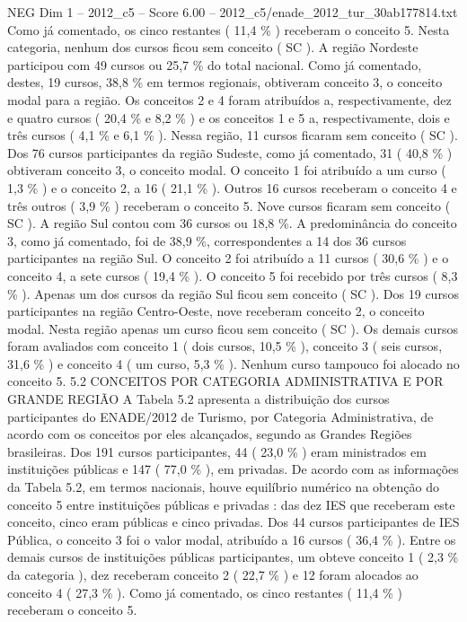 \begin{textsample}{NEG Dim 1 – 2012\_c5 – Score 6.00 – 2012\_c5/enade\_2012\_tur\_30ab177814.txt}
Como já comentado, os cinco restantes ( 11,4 \% ) receberam o conceito 5.
Nesta categoria, nenhum dos cursos ficou sem conceito ( SC ).
A região Nordeste participou com 49 cursos ou 25,7 \% do total nacional.
Como já comentado, destes, 19 cursos, 38,8 \% em termos regionais, obtiveram conceito 3, o conceito modal para a região.
Os conceitos 2 e 4 foram atribuídos a, respectivamente, dez e quatro cursos ( 20,4 \% e 8,2 \% ) e os conceitos 1 e 5 a, respectivamente, dois e três cursos ( 4,1 \% e 6,1 \% ).
Nessa região, 11 cursos ficaram sem conceito ( SC ).
Dos 76 cursos participantes da região Sudeste, como já comentado, 31 ( 40,8 \% ) obtiveram conceito 3, o conceito modal.
O conceito 1 foi atribuído a um curso ( 1,3 \% ) e o conceito 2, a 16 ( 21,1 \% ).
Outros 16 cursos receberam o conceito 4 e três outros ( 3,9 \% ) receberam o conceito 5.
Nove cursos ficaram sem conceito ( SC ).
A região Sul contou com 36 cursos ou 18,8 \%.
A predominância do conceito 3, como já comentado, foi de 38,9 \%, correspondentes a 14 dos 36 cursos participantes na região Sul.
O conceito 2 foi atribuído a 11 cursos ( 30,6 \% ) e o conceito 4, a sete cursos ( 19,4 \% ).
O conceito 5 foi recebido por três cursos ( 8,3 \% ).
Apenas um dos cursos da região Sul ficou sem conceito ( SC ).
Dos 19 cursos participantes na região Centro-Oeste, nove receberam conceito 2, o conceito modal.
Nesta região apenas um curso ficou sem conceito ( SC ).
Os demais cursos foram avaliados com conceito 1 ( dois cursos, 10,5 \% ), conceito 3 ( seis cursos, 31,6 \% ) e conceito 4 ( um curso, 5,3 \% ).
Nenhum curso tampouco foi alocado no conceito 5. 5.2 CONCEITOS POR CATEGORIA ADMINISTRATIVA E POR GRANDE REGIÃO A Tabela 5.2 apresenta a distribuição dos cursos participantes do ENADE/2012 de Turismo, por Categoria Administrativa, de acordo com os conceitos por eles alcançados, segundo as Grandes Regiões brasileiras.
Dos 191 cursos participantes, 44 ( 23,0 \% ) eram ministrados em instituições públicas e 147 ( 77,0 \% ), em privadas.
De acordo com as informações da Tabela 5.2, em termos nacionais, houve equilíbrio numérico na obtenção do conceito 5 entre instituições públicas e privadas : das dez IES que receberam este conceito, cinco eram públicas e cinco privadas.
Dos 44 cursos participantes de IES Pública, o conceito 3 foi o valor modal, atribuído a 16 cursos ( 36,4 \% ).
Entre os demais cursos de instituições públicas participantes, um obteve conceito 1 ( 2,3 \% da categoria ), dez receberam conceito 2 ( 22,7 \% ) e 12 foram alocados ao conceito 4 ( 27,3 \% ).
Como já comentado, os cinco restantes ( 11,4 \% ) receberam o conceito 5.

\end{textsample}
